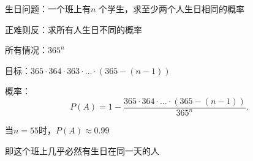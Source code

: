 \begin{eg}
    生日问题：一个班上有$n$ 个学生，求至少两个人生日相同的概率

    正难则反：求所有人生日不同的概率

    所有情况：$365^n$ 

    目标：$365\cdot 364\cdot 363\cdot \ldots\cdot (365-\left( n-1 \right)) $ 

    概率：\[
        P\left( A \right) =1-\frac{365\cdot 364\cdot \ldots\cdot (365-\left( n-1 \right)) }{365^{n}}
    .\]

    当$n=55$时，$P\left( A \right) \approx 0.99$

    即这个班上几乎必然有生日在同一天的人
\end{eg}



